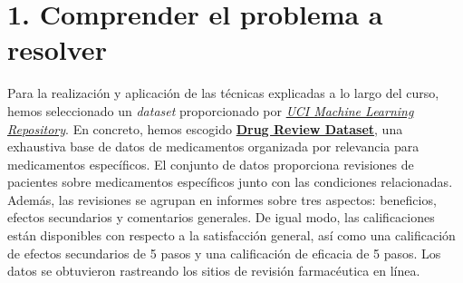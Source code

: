 \documentclass[spanish,]{article}
\begin{document}

\vspace{0.15cm}


\vspace{0.15cm}


\vspace{0.15cm}

\newpage

\thispagestyle{empty}
\tableofcontents
\newpage

\thispagestyle{empty}
\listoffigures
\newpage

\thispagestyle{empty}
\listoftables
\newpage

\pagestyle{fancy}
\fancyhf{}
\rhead{\thepage}
\setcounter{page}{1}

\hypertarget{comprender-el-problema-a-resolver}{%
\section{1. Comprender el problema a
resolver}\label{comprender-el-problema-a-resolver}}

Para la realización y aplicación de las técnicas explicadas a lo largo
del curso, hemos seleccionado un \emph{dataset} proporcionado por
\href{https://archive.ics.uci.edu/ml/index.php}{\emph{UCI Machine
Learning Repository}}. En concreto, hemos escogido
\href{https://archive.ics.uci.edu/ml/datasets/Drug+Review+Dataset+\%28Druglib.com\%29}{\textbf{Drug
Review Dataset}}, una exhaustiva base de datos de medicamentos
organizada por relevancia para medicamentos específicos. El conjunto de
datos proporciona revisiones de pacientes sobre medicamentos específicos
junto con las condiciones relacionadas. Además, las revisiones se
agrupan en informes sobre tres aspectos: beneficios, efectos secundarios
y comentarios generales. De igual modo, las calificaciones están
disponibles con respecto a la satisfacción general, así como una
calificación de efectos secundarios de 5 pasos y una calificación de
eficacia de 5 pasos. Los datos se obtuvieron rastreando los sitios de
revisión farmacéutica en línea.
\end{document}
